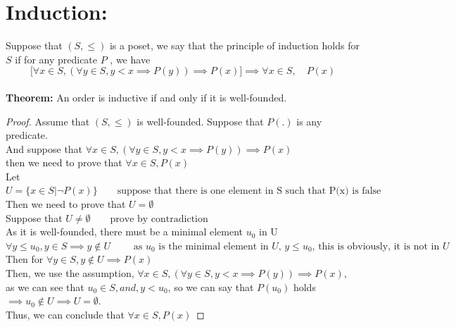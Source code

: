 \documentclass [9 pt]{article}
\theoremstyle{definition}
\begin{document}
\section*{Induction: }
Suppose that $(S, \leq)$ is a poset, we say that the principle of induction holds for $S$ if for any predicate $P$ , we have
$$\bigg[ \forall x \in  S, ( \forall y \in S, y < x \implies P(y)) \implies P(x) \bigg] \implies \forall x \in  S, \quad P(x) $$\\
\textbf{Theorem: } An order is inductive if and only if it is well-founded.
\begin{proof}
	Assume that $(S, \leq)$ is well-founded. Suppose that $P(.)$ is any predicate.\\
	And suppose that $\forall x \in  S, ( \forall y \in S, y < x \implies P(y)) \implies P(x) $\\
	then we need to prove that $\forall x \in S, P(x)$\\
	Let $U = \bigg\{x\in S | \neg P(x) \bigg\} \quad \quad \text{suppose that there is one element in S such that P(x) is false}$\\
	Then we need to prove that $U = \emptyset $ \\
	\newline
	Suppose that $U \neq \emptyset \quad \quad \text{prove by contradiction}$\\
	As it is well-founded, there must be a minimal element $u_0$ in U\\
	$ \forall y \leq u_0, y \in S \implies y \notin U \quad \quad \text{ as $u_0$ is the minimal element in $U$, $y \leq u_0$, this is obviously, it is not in $U$ } $\\
	Then for $\forall y \in S, y \notin U \implies P(x)$\\
	Then, we use the assumption, $\forall x \in  S, ( \forall y \in S, y < x \implies P(y)) \implies P(x) $, \\
	as we can see that $u_0 \in S, and, y < u_0  $, so we can say that $P(u_0)$ holds $\implies u_0 \notin U \implies U = \emptyset$.\\
	Thus, we can conclude that $\forall x \in S, P(x)$
	
	
\end{proof}
\end{document}
